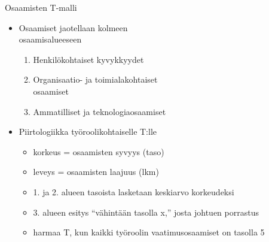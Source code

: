 \documentclass[first=purple,second=dblue,logo=redquo]{aaltoslides}
\begin{document}
\begin{frame}{Osaamisten T-malli}
\begin{itemize}
\item Osaamiset jaotellaan kolmeen \\ osaamisalueeseen
\begin{enumerate}
\item Henkilökohtaiset kyvykkyydet
\item Organisaatio- ja toimialakohtaiset \\ osaamiset
\item Ammatilliset ja teknologiaosaamiset
\end{enumerate}
\item Piirtologiikka työroolikohtaiselle T:lle
\begin{itemize}
\item korkeus = osaamisten syvyys (taso)
\item leveys = osaamisten laajuus (lkm)
\item 1. ja 2. alueen tasoista lasketaan keskiarvo korkeudeksi
\item 3. alueen esitys ``vähintään tasolla x,'' josta johtuen porrastus
\item harmaa T, kun kaikki työroolin vaatimusosaamiset on tasolla 5
\end{itemize}
\end{itemize}
\end{frame}
\end{document}
